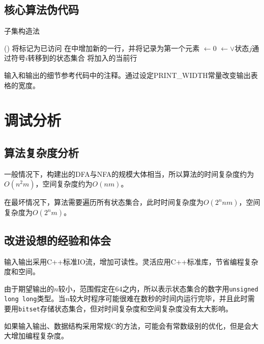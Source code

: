 \documentclass[lang=cn,11pt,a4paper,cite=authornum]{paper}
\begin{document}
\subsection{核心算法伪代码}

\begin{algorithm}[htbp]
    \caption{子集构造法\label{algo:cons}}
    \Fn(){\Dfs{\Stat}}{
    将\Stat 标记为已访问\;
    在\Ans 中增加新的一行，并将\Stat 记录为第一个元素\;
    {
        \NxtStat$\leftarrow 0$\;
            {\NxtStat $\leftarrow$\NxtStat$ \vee $状态$j$通过符号$i$转移到的状态集合\;}
        将\NxtStat 加入\Ans 的当前行\;
    }
    }
\end{algorithm}

输入和输出的细节参考代码中的注释。通过设定PRINT\_WIDTH常量改变输出表格的宽度。

\section{调试分析}

\subsection{算法复杂度分析}

一般情况下，构建出的DFA与NFA的规模大体相当，所以算法的时间复杂度约为$O(n^2m)$，空间复杂度约为$O(nm)$。

在最坏情况下，算法需要遍历所有状态集合，此时时间复杂度为$O(2^nnm)$，空间复杂度为$O(2^nm)$。

\subsection{改进设想的经验和体会}

输入输出采用C++标准IO流，增加可读性。灵活应用C++标准库，节省编程复杂度和空间。

由于期望输出的$n$较小，范围假定在$64$之内，所以表示状态集合的数字用\texttt{unsigned long long}类型。当$n$较大时程序可能很难在数秒的时间内运行完毕，并且此时需要用\texttt{bitset}存储状态集合，但对时间复杂度和空间复杂度没有太大影响。

如果输入输出、数据结构采用常规C的方法，可能会有常数级别的优化，但是会大大增加编程复杂度。
\end{document}
